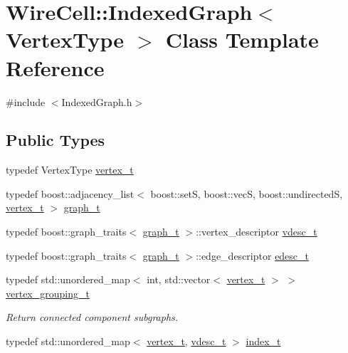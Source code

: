 \hypertarget{class_wire_cell_1_1_indexed_graph}{}\section{Wire\+Cell\+:\+:Indexed\+Graph$<$ Vertex\+Type $>$ Class Template Reference}
\label{class_wire_cell_1_1_indexed_graph}


{\ttfamily \#include $<$Indexed\+Graph.\+h$>$}

\subsection*{Public Types}
\begin{DoxyCompactItemize}
\item 
typedef Vertex\+Type \hyperlink{class_wire_cell_1_1_indexed_graph_ac26b25ac103373dde929a982d948d1b5}{vertex\+\_\+t}
\item 
typedef boost\+::adjacency\+\_\+list$<$ boost\+::setS, boost\+::vecS, boost\+::undirectedS, \hyperlink{class_wire_cell_1_1_indexed_graph_ac26b25ac103373dde929a982d948d1b5}{vertex\+\_\+t} $>$ \hyperlink{class_wire_cell_1_1_indexed_graph_a5593f08e4be84de33ebf37de7d071819}{graph\+\_\+t}
\item 
typedef boost\+::graph\+\_\+traits$<$ \hyperlink{class_wire_cell_1_1_indexed_graph_a5593f08e4be84de33ebf37de7d071819}{graph\+\_\+t} $>$\+::vertex\+\_\+descriptor \hyperlink{class_wire_cell_1_1_indexed_graph_a8bad4d4e6f2d8a8109e95757d502c9ba}{vdesc\+\_\+t}
\item 
typedef boost\+::graph\+\_\+traits$<$ \hyperlink{class_wire_cell_1_1_indexed_graph_a5593f08e4be84de33ebf37de7d071819}{graph\+\_\+t} $>$\+::edge\+\_\+descriptor \hyperlink{class_wire_cell_1_1_indexed_graph_a7dabdef2dec280294d6ead6f0fdc66c8}{edesc\+\_\+t}
\item 
typedef std\+::unordered\+\_\+map$<$ int, std\+::vector$<$ \hyperlink{class_wire_cell_1_1_indexed_graph_ac26b25ac103373dde929a982d948d1b5}{vertex\+\_\+t} $>$ $>$ \hyperlink{class_wire_cell_1_1_indexed_graph_af5e6a57c2c26d4f3036745cfe73a8a98}{vertex\+\_\+grouping\+\_\+t}
\begin{DoxyCompactList}\small\item\em Return connected component subgraphs. \end{DoxyCompactList}\item 
typedef std\+::unordered\+\_\+map$<$ \hyperlink{class_wire_cell_1_1_indexed_graph_ac26b25ac103373dde929a982d948d1b5}{vertex\+\_\+t}, \hyperlink{class_wire_cell_1_1_indexed_graph_a8bad4d4e6f2d8a8109e95757d502c9ba}{vdesc\+\_\+t} $>$ \hyperlink{class_wire_cell_1_1_indexed_graph_aae3465237209e244b48b594b6284526e}{index\+\_\+t}
\end{DoxyCompactItemize}
